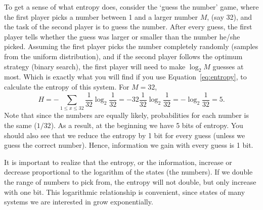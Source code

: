 To get a sense of what entropy does,
consider the `guess the number' game,
where the first player picks a number between \num{1} and a larger number $M$,
(say 32),
and the task of the second player is to guess the number.
After every guess,
the first player tells whether the guess was
larger or smaller than the number he/she picked.
Assuming the first player picks the number completely randomly
(samples from the uniform distribution),
and if the second player follows the optimum strategy (binary search),
the first player will need to make $\log_{2} M$ guesses at most.%
Which is exactly what you will find if you use Equation~\ref{eq:entropy},
to calculate the entropy of this system.
For $M = 32$, 
\[
  H = - \sum_{1 \le x \le 32} \frac{1}{32} \log_{2} \frac{1}{32}
  = - 32 \frac{1}{32} \log_{2} \frac{1}{32} = - \log_{2} \frac{1}{32}
  = 5 .
\]
Note that since the numbers are equally likely,
probabilities for each number is the same ($1/32$).
As a result,
at the beginning we have \num{5} bits of entropy.
You should also see that we reduce the entropy by \num{1} bit for every guess
(unless we guess the correct number).
Hence, information we gain with every guess is \num{1} bit.

It is important to realize that
the entropy, or the information,
increase or decrease proportional to the logarithm of the states (the numbers).
If we double the range of numbers to pick from,
the entropy will not double, but only increase with one bit.
This logarithmic relationship is convenient,
since states of many systems we are interested in grow exponentially.

